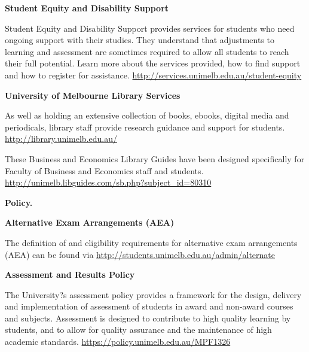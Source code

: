 \documentclass[10pt]{article}
\begin{document}
\begin{multicols}{2}
\smallskip\noindent\textbf{Student Equity and Disability Support}

\smallskip\noindent Student Equity and Disability Support provides services for students who need ongoing support with their studies. They understand that adjustments to learning and assessment are sometimes required to allow all students to reach their full potential. Learn more about the services provided, how to find support and how to register for assistance. \href{http://services.unimelb.edu.au/student-equity}{http://services.unimelb.edu.au/student-equity}

\smallskip\noindent\textbf{University of Melbourne Library Services}

\smallskip\noindent As well as holding an extensive collection of books, ebooks, digital media and periodicals, library staff provide research guidance and support for students. \href{http://library.unimelb.edu.au/}{http://library.unimelb.edu.au/}

\smallskip\noindent These Business and Economics Library Guides have been designed specifically for Faculty of Business and Economics staff and students. \href{http://unimelb.libguides.com/sb.php?subject_id=80310}{http://unimelb.libguides.com/sb.php?subject\_id=80310}





\bigskip\noindent\textbf{\large Policy.} 

\smallskip\noindent\textbf{Alternative Exam Arrangements (AEA)}

\smallskip\noindent The definition of and eligibility requirements for alternative exam arrangements (AEA) can be found via \href{http://students.unimelb.edu.au/admin/alternate}{http://students.unimelb.edu.au/admin/alternate}


\smallskip\noindent\textbf{Assessment and Results Policy}

\smallskip\noindent The University?s assessment policy provides a framework for the design, delivery and implementation of assessment of students in award and non-award courses and subjects. Assessment is designed to contribute to high quality learning by students, and to allow for quality assurance and the maintenance of high academic standards. \href{https://policy.unimelb.edu.au/MPF1326}{https://policy.unimelb.edu.au/MPF1326}


\end{multicols}
\end{document}
